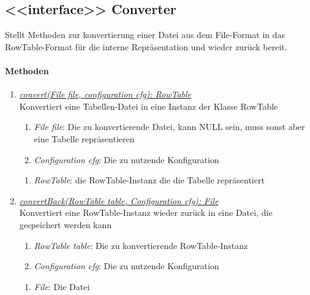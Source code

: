 \subsection*{<{<{interface}>}> Converter}\label{conv}
Stellt Methoden zur konvertierung einer Datei aus dem File-Format in das RowTable-Format für die interne Repräsentation und wieder zurück bereit. \\

\paragraph{Methoden}
\begin{enumerate}[+]
	\item \underline{\textit{convert(File file, configuration cfg): RowTable}} \\
	Konvertiert eine Tabellen-Datei in eine Instanz der Klasse RowTable
	
	\begin{enumerate}[$\bullet$]
		\item \textit{File file}: Die zu konvertierende Datei, kann NULL sein, muss sonst aber eine Tabelle repräsentieren
		\item \textit{Configuration cfg}: Die zu nutzende Konfiguration
	\end{enumerate}
	\vspace{-0.2cm}
	\begin{enumerate}[$\circ$]
		\item \textit{RowTable}: die RowTable-Instanz die die Tabelle repräsentiert
	\end{enumerate}

	\item \underline{\textit{convertBack(RowTable table, Configuration cfg): File}} \\
	Konvertiert eine RowTable-Instanz wieder zurück in eine Datei, die gespeichert werden kann
	\begin{enumerate}[$\bullet$]
		\item \textit{RowTable table}: Die zu konvertierende RowTable-Instanz
		\item \textit{Configuration cfg}: Die zu nutzende Konfiguration
	\end{enumerate}
	\vspace{-0.2cm}
	\begin{enumerate}[$\circ$]
		\item \textit{File}: Die Datei
	\end{enumerate}
\end{enumerate}